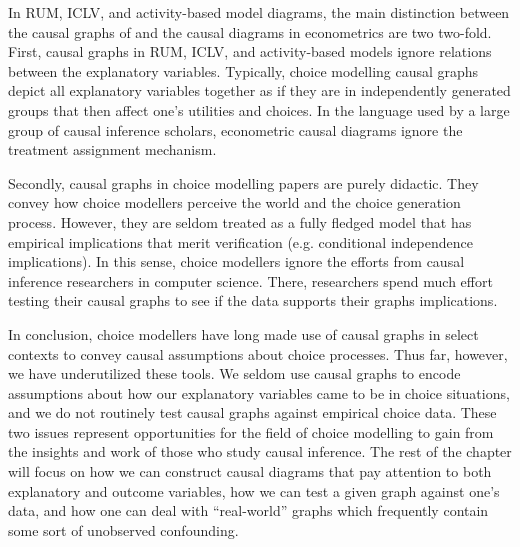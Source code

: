 In RUM, ICLV, and activity-based model diagrams, the main distinction between the causal graphs of \citet{pearl_1995_causal} and the causal diagrams in econometrics are two two-fold.
First, causal graphs in RUM, ICLV, and activity-based models ignore relations between the explanatory variables.
Typically, choice modelling causal graphs depict all explanatory variables together as if they are in independently generated groups that then affect one's utilities and choices.
In the language used by a large group of causal inference scholars, econometric causal diagrams ignore the treatment assignment mechanism.

Secondly, causal graphs in choice modelling papers are purely didactic.
They convey how choice modellers perceive the world and the choice generation process.
However, they are seldom treated as a fully fledged model that has empirical implications that merit verification (e.g. conditional independence implications).
In this sense, choice modellers ignore the efforts from causal inference researchers in computer science.
There, researchers spend much effort testing their causal graphs to see if the data supports their graphs implications.

In conclusion, choice modellers have long made use of causal graphs in select contexts to convey causal assumptions about choice processes.
Thus far, however, we have underutilized these tools.
We seldom use causal graphs to encode assumptions about how our explanatory variables came to be in choice situations, and we do not routinely test causal graphs against empirical choice data.
These two issues represent opportunities for the field of choice modelling to gain from the insights and work of those who study causal inference.
The rest of the chapter will focus on how we can construct causal diagrams that pay attention to both explanatory and outcome variables, how we can test a given graph against one's data, and how one can deal with ``real-world'' graphs which frequently contain some sort of unobserved confounding.

